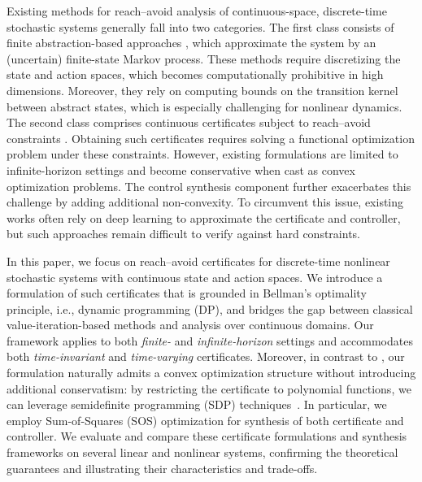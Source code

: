 \documentclass[journal,twoside,web]{ieeecolor}
\theoremstyle{definition}
\theoremstyle{plain}
\theoremstyle{plain}
\begin{document}
Existing methods for reach–avoid analysis of continuous-space, discrete-time stochastic systems generally fall into two categories. The first class consists of finite abstraction-based approaches \cite{lahijanian2015formal, gracia2025efficient, lunze2003discrete, coppola2024data, kariotoglou2017linear}, which approximate the system by an (uncertain) finite-state Markov process. These methods require discretizing the state and action spaces, which becomes computationally prohibitive in high dimensions. Moreover, they rely on computing bounds on the transition kernel between abstract states, which is especially challenging for nonlinear dynamics.
% 
The second class comprises continuous certificates subject to reach–avoid constraints \cite{vzikelic2023learning, wicker2024probabilistic}. Obtaining such certificates requires solving a functional optimization problem under these constraints. However, existing formulations are limited to infinite-horizon settings and 
become conservative when cast as convex optimization problems.
The control synthesis component further exacerbates this challenge by adding additional non-convexity.
To circumvent this issue, existing works often rely on deep learning to approximate the certificate and controller, but such approaches remain difficult to verify against hard constraints.

In this paper, we focus on reach–avoid certificates for discrete-time nonlinear stochastic systems with continuous state and action spaces. We introduce a formulation of such certificates that is grounded in Bellman's optimality principle, i.e., dynamic programming (DP),  and bridges the gap between classical value-iteration-based methods and analysis over continuous domains. Our framework applies to both \emph{finite-} and \emph{infinite-horizon} settings and accommodates both \emph{time-invariant} and \emph{time-varying} certificates.
Moreover, in contrast to \cite{vzikelic2023learning, wicker2024probabilistic}, our formulation naturally admits a convex optimization structure without introducing additional conservatism: by restricting the certificate to polynomial functions, we can leverage semidefinite programming (SDP) techniques~\cite{vandenberghe1996semidefinite}. In particular, we employ Sum-of-Squares (SOS) optimization for synthesis of both certificate and controller. 
% 
% 
We evaluate and compare these certificate formulations and synthesis frameworks on several linear and nonlinear systems, confirming the theoretical guarantees and illustrating their characteristics and trade-offs.
\end{document}

